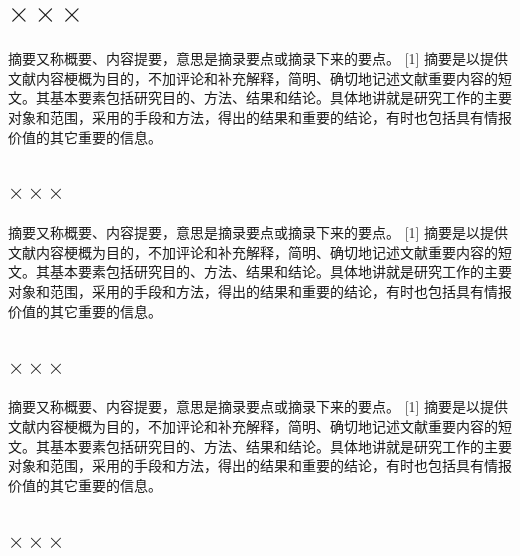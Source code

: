 \documentclass[12pt,oneside,a4paper,fleqn]{ctexart}
\begin{document}
\vspace{0.5em} {\heiti \section{ $\times \times \times $}} \vspace{0.5em}\begin{spacing}{1.25}


摘要又称概要、内容提要，意思是摘录要点或摘录下来的要点。 [1]  摘要是以提供文献内容梗概为目的，不加评论和补充解释，简明、确切地记述文献重要内容的短文。其基本要素包括研究目的、方法、结果和结论。具体地讲就是研究工作的主要对象和范围，采用的手段和方法，得出的结果和重要的结论，有时也包括具有情报价值的其它重要的信息。


\end{spacing}\vspace{0.5em} {\heiti \subsection{ $\times \times \times $}}\begin{spacing}{1.25}

摘要又称概要、内容提要，意思是摘录要点或摘录下来的要点。 [1]  摘要是以提供文献内容梗概为目的，不加评论和补充解释，简明、确切地记述文献重要内容的短文。其基本要素包括研究目的、方法、结果和结论。具体地讲就是研究工作的主要对象和范围，采用的手段和方法，得出的结果和重要的结论，有时也包括具有情报价值的其它重要的信息。


\end{spacing}\vspace{0.5em} {\heiti \subsection{ $\times \times \times $}}\begin{spacing}{1.25}

摘要又称概要、内容提要，意思是摘录要点或摘录下来的要点。 [1]  摘要是以提供文献内容梗概为目的，不加评论和补充解释，简明、确切地记述文献重要内容的短文。其基本要素包括研究目的、方法、结果和结论。具体地讲就是研究工作的主要对象和范围，采用的手段和方法，得出的结果和重要的结论，有时也包括具有情报价值的其它重要的信息。


\end{spacing}\vspace{0.5em} {\heiti \subsection{ $\times \times \times $}}\begin{spacing}{1.25}


\end{spacing}
\end{document}

